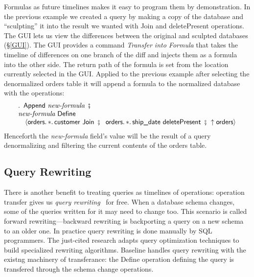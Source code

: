 \documentclass[english,submission]{programming}
\theoremstyle{definition}
\DeclareMathOperator{\exec}{\ \fatsemi\ \ }
\begin{document}
Formulas as future timelines makes it easy to program them by demonstration. In the previous example we created a query by making a copy of the database and ``sculpting'' it into the result we wanted with \textsf{Join} and \textsf{deletePresent} operations. The GUI lets us view the differences between the original and sculpted databases (\S\ref{GUI}). The GUI provides a command \textit{Transfer into Formula} that takes the timeline of differences on one branch of the diff and injects them as a formula into the other side. The return path of the formula is set from the location currently selected in the GUI. Applied to the previous example after selecting the denormalized \textsf{orders} table it will append a formula to the normalized database with the operations:
\[
\begin{array}{l}
  \ldotp \textsf{ Append } \textit{new-formula} \exec\\
  \textit{new-formula} \textsf{ Define } \\
  \quad \langle
\textsf{orders}\ldotp * \ldotp \textsf{customer Join} \exec
\textsf{orders}\ldotp * \ldotp \textsf{ship\_date deletePresent} \exec
\!\!\uparrow \textsf{orders}
  \rangle\\
\end{array}
\]
Henceforth the \textit{new-formula} field's value will be the result of a query  denormalizing and filtering the current contents of the orders table.






\subsection{Query Rewriting}\label{query-rewriting}

There is another benefit to treating queries as timelines of operations: operation transfer gives us \textit{query rewriting}~\cite{curino08, herrmann17} for free. When a database schema changes, some of the queries written for it may need to change too. This scenario is called forward rewriting---backward rewriting is backporting a query on a new schema to an older one.
In practice query rewriting is done manually by SQL programmers. The just-cited research adapts query optimization techniques to build specialized rewriting algorithms.
Baseline handles query rewriting with the existng machinery of transferance: the \textsf{Define} operation defining the query is transfered through the schema change operations.
\end{document}
